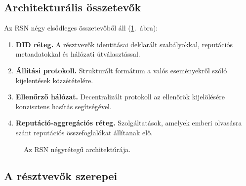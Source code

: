 \documentclass[11pt,a4paper,twocolumn]{article}
\begin{document}
\subsection{Architekturális összetevők}

Az RSN négy elsődleges összetevőből áll (\ref{fig:architecture}.~ábra):
\begin{enumerate}[nosep]
\item \textbf{DID réteg.} A résztvevők identitásai deklarált szabályokkal, reputációs metaadatokkal és hálózati útválasztással.
\item \textbf{Állítási protokoll.} Strukturált formátum a valós eseményekről szóló kijelentések közzétételére.
\item \textbf{Ellenőrző hálózat.} Decentralizált protokoll az ellenőrök kijelölésére konzisztens hasítás segítségével.
\item \textbf{Reputáció-aggregációs réteg.} Szolgáltatások, amelyek emberi olvasásra szánt reputációs összefoglalókat állítanak elő.
\end{enumerate}

\begin{figure}[ht]
\centering
{}
\caption{Az RSN négyrétegű architektúrája.}
\label{fig:architecture}
\end{figure}

\subsection{A résztvevők szerepei}
\end{document}
